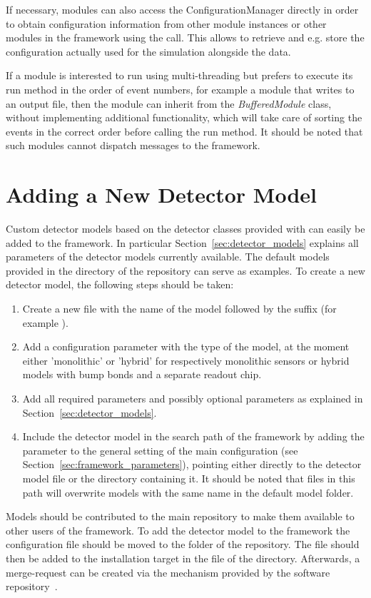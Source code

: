 If necessary, modules can also access the ConfigurationManager directly in order to obtain configuration information from other module instances or other modules in the framework using the  call.
This allows to retrieve and e.g. store the configuration actually used for the simulation alongside the data.

If a module is interested to run using multi-threading but prefers to execute its run method in the order of event numbers, for example a module that writes to an output file, then the module can inherit from the \textit{BufferedModule} class, without implementing additional functionality, which will take care of sorting the events in the correct order before calling the run method.
It should be noted that such modules cannot dispatch messages to the framework.

\section{Adding a New Detector Model}
\label{sec:adding_detector_model}
Custom detector models based on the detector classes provided with \apsq can easily be added to the framework.
In particular Section~\ref{sec:detector_models} explains all parameters of the detector models currently available.
The default models provided in the  directory of the repository can serve as examples.
To create a new detector model, the following steps should be taken:
\begin{enumerate}
\item Create a new file with the name of the model followed by the  suffix (for example ).
\item Add a configuration parameter  with the type of the model, at the moment either 'monolithic' or 'hybrid' for respectively monolithic sensors or hybrid models with bump bonds and a separate readout chip.
\item Add all required parameters and possibly optional parameters as explained in Section~\ref{sec:detector_models}.
\item Include the detector model in the search path of the framework by adding the  parameter to the general setting of the main configuration (see Section~\ref{sec:framework_parameters}), pointing either directly to the detector model file or the directory containing it. It should be noted that files in this path will overwrite models with the same name in the default model folder.
\end{enumerate}

Models should be contributed to the main repository to make them available to other users of the framework.
To add the detector model to the framework the configuration file should be moved to the  folder of the repository.
The file should then be added to the installation target in the  file of the  directory.
Afterwards, a merge-request can be created via the mechanism provided by the software repository~\cite{ap2-repo}.
